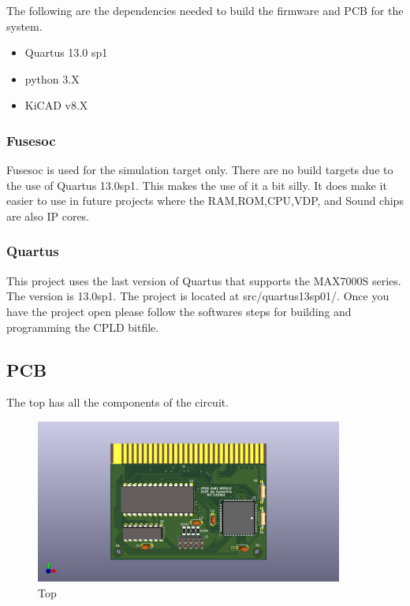 \par
The following are the dependencies needed to build the firmware and PCB for the system.

\begin{itemize}
  \item Quartus 13.0 sp1
  \item python 3.X
  \item KiCAD v8.X
\end{itemize}



\subsubsection{Fusesoc}
\par
Fusesoc is used for the simulation target only. There are no build targets due to the use of Quartus 13.0sp1.
This makes the use of it a bit silly. It does make it easier to use in future projects where the RAM,ROM,CPU,VDP,
and Sound chips are also IP cores.



\subsubsection{Quartus}
\par
This project uses the last version of Quartus that supports the MAX7000S series. The version is 13.0sp1.
The project is located at src/quartus13sp01/. Once you have the project open please follow the softwares steps
for building and programming the CPLD bitfile.

\subsection{PCB}

\par
The top has all the components of the circuit.

\begin{figure}[h!]
\caption{Top}
\centering
\includegraphics[width=0.90\textwidth,keepaspectratio]{img/ogm_top.png}
\end{figure}

